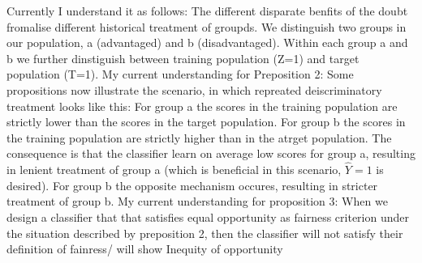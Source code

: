 Currently I understand it as follows:
The different disparate benfits of the doubt fromalise different historical treatment of groupds.
We distinguish two groups in our population, a (advantaged) and b (disadvantaged). Within each group a and b we further dinstiguish between training population (Z=1) and target population (T=1).
My current understanding for Preposition 2: Some propositions now illustrate the scenario, in which repreated deiscriminatory treatment looks like this: For group a the scores in the training population are strictly lower than the scores in the target population. For group b the scores in the training population are strictly higher than in the atrget population. The consequence is that the classifier learn on average low scores for group a, resulting in lenient treatment of group a (which is beneficial in this scenario, $\hat{Y} = 1$ is desired). For group b the opposite mechanism occures, resulting in stricter treatment of group b.
My current understanding for proposition 3: When we design a classifier that that satisfies equal opportunity as fairness criterion under the situation described by preposition 2, then the classifier will not satisfy their definition of fainress/ will show Inequity of opportunity

